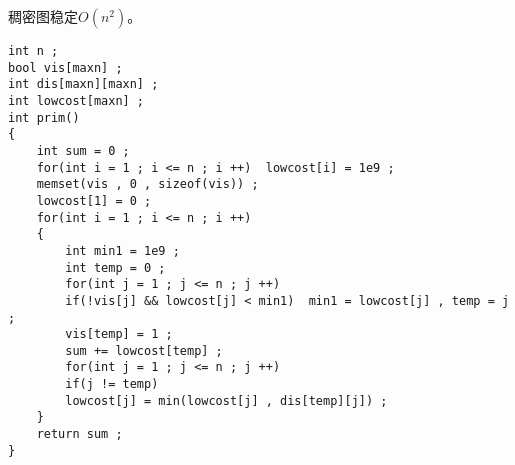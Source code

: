 \documentclass[E:/GsjzTle/main/main.tex]{subfiles}
\begin{document}
稠密图稳定$O(n^2)$。


\begin{lstlisting}
int n ;
bool vis[maxn] ;
int dis[maxn][maxn] ;
int lowcost[maxn] ;
int prim()
{
	int sum = 0 ;
	for(int i = 1 ; i <= n ; i ++)  lowcost[i] = 1e9 ;
	memset(vis , 0 , sizeof(vis)) ;
	lowcost[1] = 0 ;
	for(int i = 1 ; i <= n ; i ++)
	{    
		int min1 = 1e9 ;
		int temp = 0 ;
		for(int j = 1 ; j <= n ; j ++)
		if(!vis[j] && lowcost[j] < min1)  min1 = lowcost[j] , temp = j ;
		vis[temp] = 1 ;
		sum += lowcost[temp] ;
		for(int j = 1 ; j <= n ; j ++)
		if(j != temp)
		lowcost[j] = min(lowcost[j] , dis[temp][j]) ; 
	}
	return sum ;
}
\end{lstlisting}
\end{document}
